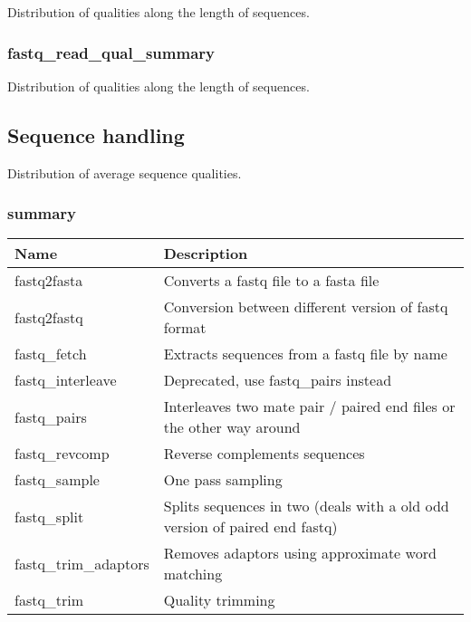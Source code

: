 \documentclass[a4paper,12pt]{article}
\begin{document}
Distribution of qualities along the length of sequences.

\subsubsection{fastq\_read\_qual\_summary}

Distribution of qualities along the length of sequences.


\subsection{Sequence handling}

Distribution of average sequence qualities.

\subsubsection{summary}

\begin{tabularx}{\textwidth}{|X|X|}
    \hline
    \textbf{Name}                   & \textbf{Description} \\
    \hline
    \hline
    fastq2fasta                     & Converts a fastq file to a fasta file \\
    fastq2fastq                     & Conversion between different version of fastq format \\
    fastq\_fetch                    & Extracts sequences from a fastq file by name \\
    fastq\_interleave               & Deprecated, use fastq\_pairs instead \\
    fastq\_pairs                    & Interleaves two mate pair / paired end files or the other way around \\
    fastq\_revcomp                  & Reverse complements sequences \\
    fastq\_sample                   & One pass sampling \\
    fastq\_split                    & Splits sequences in two (deals with a old odd version of paired end fastq) \\
    fastq\_trim\_adaptors           & Removes adaptors using approximate word matching \\
    fastq\_trim                     & Quality trimming \\
    \hline
\end{tabularx}
\end{document}
